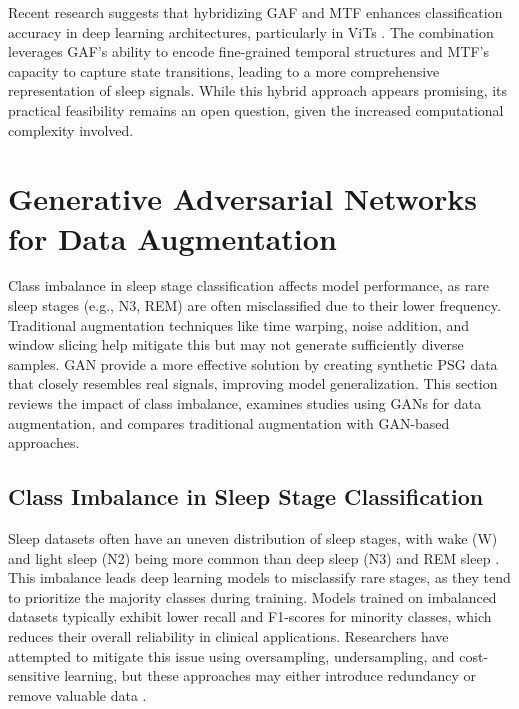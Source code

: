 Recent research suggests that hybridizing GAF and MTF enhances classification accuracy in deep learning architectures, particularly in ViTs \parencite{wang2015encoding}. The combination leverages GAF’s ability to encode fine-grained temporal structures and MTF’s capacity to capture state transitions, leading to a more comprehensive representation of sleep signals. While this hybrid approach appears promising, its practical feasibility remains an open question, given the increased computational complexity involved.


\section{Generative Adversarial Networks for Data Augmentation}
\label{lit:4}

Class imbalance in sleep stage classification affects model performance, as rare sleep stages (e.g., N3, REM) are often misclassified due to their lower frequency. Traditional augmentation techniques like time warping, noise addition, and window slicing help mitigate this but may not generate sufficiently diverse samples. GAN provide a more effective solution by creating synthetic PSG data that closely resembles real signals, improving model generalization. This section reviews the impact of class imbalance, examines studies using GANs for data augmentation, and compares traditional augmentation with GAN-based approaches.

\subsection{Class Imbalance in Sleep Stage Classification}

Sleep datasets often have an uneven distribution of sleep stages, with wake (W) and light sleep (N2) being more common than deep sleep (N3) and REM sleep \parencite{pardamean2023supervised}. This imbalance leads deep learning models to misclassify rare stages, as they tend to prioritize the majority classes during training. Models trained on imbalanced datasets typically exhibit lower recall and F1-scores for minority classes, which reduces their overall reliability in clinical applications. Researchers have attempted to mitigate this issue using oversampling, undersampling, and cost-sensitive learning, but these approaches may either introduce redundancy or remove valuable data \parencite{weiss2007cost}.

